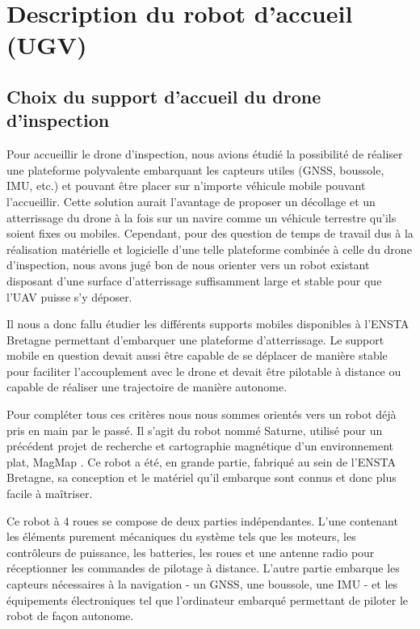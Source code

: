 \section{Description du robot d’accueil (UGV)}

\subsection{Choix du support d’accueil du drone d’inspection}

Pour accueillir le drone d’inspection, nous avions étudié la possibilité de réaliser une plateforme polyvalente embarquant les capteurs utiles (GNSS, boussole, IMU, etc.) et pouvant être placer sur n’importe véhicule mobile pouvant l’accueillir. Cette solution aurait l’avantage de proposer un décollage et un atterrissage du drone à la fois sur un navire comme un véhicule terrestre qu’ils soient fixes ou mobiles.
Cependant, pour des question de temps de travail dus à la réalisation matérielle et logicielle d’une telle plateforme combinée à celle du drone d’inspection, nous avons jugé bon de nous orienter vers un robot existant disposant d’une surface d'atterrissage suffisamment large et stable pour que l’UAV puisse s’y déposer.

Il nous a donc fallu étudier les différents supports mobiles disponibles à l’ENSTA Bretagne permettant d’embarquer une plateforme d'atterrissage. Le support mobile en question devait aussi être capable de se déplacer de manière stable pour faciliter l’accouplement avec le drone et devait être pilotable à distance ou capable de réaliser une trajectoire de manière autonome.

Pour compléter tous ces critères nous nous sommes orientés vers un robot déjà pris en main par le passé. Il s’agit du robot nommé Saturne, utilisé pour un précédent projet de recherche et cartographie magnétique d’un environnement plat, MagMap \cite{magmap}. Ce robot a été, en grande partie, fabriqué au sein de l’ENSTA Bretagne, sa conception et le matériel qu’il embarque sont connus et donc plus facile à maîtriser.

Ce robot à 4 roues se compose de deux parties indépendantes.
L’une contenant les éléments purement mécaniques du système tels que les moteurs, les contrôleurs de puissance, les batteries, les roues et une antenne radio pour réceptionner les commandes de pilotage à distance.
L’autre partie embarque les capteurs nécessaires à la navigation - un GNSS, une boussole, une IMU - et les équipements électroniques tel que l’ordinateur embarqué permettant de piloter le robot de façon autonome.

